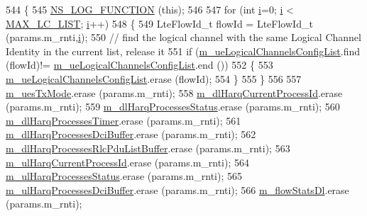 \begin{DoxyCode}
544 \{
545   \hyperlink{log-macros-disabled_8h_a90b90d5bad1f39cb1b64923ea94c0761}{NS\_LOG\_FUNCTION} (\textcolor{keyword}{this});
546 
547   \textcolor{keywordflow}{for} (\textcolor{keywordtype}{int} \hyperlink{bernuolliDistribution_8m_a6f6ccfcf58b31cb6412107d9d5281426}{i}=0; \hyperlink{bernuolliDistribution_8m_a6f6ccfcf58b31cb6412107d9d5281426}{i} < \hyperlink{ff-mac-common_8h_a7c5f9089622a954046da0233f8170d7b}{MAX\_LC\_LIST}; \hyperlink{bernuolliDistribution_8m_a6f6ccfcf58b31cb6412107d9d5281426}{i}++)
548     \{
549       LteFlowId\_t flowId = LteFlowId\_t (params.m\_rnti,\hyperlink{bernuolliDistribution_8m_a6f6ccfcf58b31cb6412107d9d5281426}{i});
550       \textcolor{comment}{// find the logical channel with the same Logical Channel Identity in the current list, release it}
551       \textcolor{keywordflow}{if} (\hyperlink{classns3_1_1CqaFfMacScheduler_a2e7fafcc959bf531979bc041782ac5b1}{m\_ueLogicalChannelsConfigList}.find (flowId)!= 
      \hyperlink{classns3_1_1CqaFfMacScheduler_a2e7fafcc959bf531979bc041782ac5b1}{m\_ueLogicalChannelsConfigList}.end ())
552         \{
553           \hyperlink{classns3_1_1CqaFfMacScheduler_a2e7fafcc959bf531979bc041782ac5b1}{m\_ueLogicalChannelsConfigList}.erase (flowId);
554         \}
555     \}
556 
557   \hyperlink{classns3_1_1CqaFfMacScheduler_ac556c4275bc3c2c078fd5856069ba0ca}{m\_uesTxMode}.erase (params.m\_rnti);
558   \hyperlink{classns3_1_1CqaFfMacScheduler_a1fc0136a3398fb51805a2a91e40d820e}{m\_dlHarqCurrentProcessId}.erase (params.m\_rnti);
559   \hyperlink{classns3_1_1CqaFfMacScheduler_ad68bd0730def22b00204de5f3a8fb109}{m\_dlHarqProcessesStatus}.erase  (params.m\_rnti);
560   \hyperlink{classns3_1_1CqaFfMacScheduler_a2e130ab374b4770c3544495ba593f023}{m\_dlHarqProcessesTimer}.erase (params.m\_rnti);
561   \hyperlink{classns3_1_1CqaFfMacScheduler_a4de0e4833545b31fcb31f77492a34380}{m\_dlHarqProcessesDciBuffer}.erase  (params.m\_rnti);
562   \hyperlink{classns3_1_1CqaFfMacScheduler_a019cbb20e91d699a8c7e26fb8d69ff4e}{m\_dlHarqProcessesRlcPduListBuffer}.erase  (params.m\_rnti);
563   \hyperlink{classns3_1_1CqaFfMacScheduler_a55974c35f8b783bb902ae8676fb6ff10}{m\_ulHarqCurrentProcessId}.erase  (params.m\_rnti);
564   \hyperlink{classns3_1_1CqaFfMacScheduler_a6dd8ea014c55132578f7c050e726f856}{m\_ulHarqProcessesStatus}.erase  (params.m\_rnti);
565   \hyperlink{classns3_1_1CqaFfMacScheduler_a9af9c203c1b5fc43336988caf2294562}{m\_ulHarqProcessesDciBuffer}.erase  (params.m\_rnti);
566   \hyperlink{classns3_1_1CqaFfMacScheduler_a1cf6c47e55cbcfb9c28b17c242bde972}{m\_flowStatsDl}.erase  (params.m\_rnti);

\end{DoxyCode}

